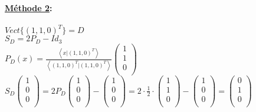 \documentclass{article}
\newcommand{\scalaire}[2]{\left< #1 | #2\right>}
\begin{document}
\paragraph{\underline{Méthode 2}:} $Vect \{(1, 1, 0)^T\} = D$\\
$S_D = 2P_D - Id_3$\\
$P_D(x) = \frac{\scalaire{x}{(1, 1, 0)^T}}{\scalaire{(1, 1, 0)^T}{(1, 1, 0)^T}} \begin{pmatrix}
    1\\
    1\\
    0\\
\end{pmatrix}$\\
$S_D\begin{pmatrix}
    1\\
    0\\
    0\\
\end{pmatrix} = 2P_D\begin{pmatrix}
    1\\
    0\\
    0\\
\end{pmatrix} - \begin{pmatrix}
    1\\
    0\\
    0\\
\end{pmatrix} = 2 \cdot \frac{1}{2} \cdot \begin{pmatrix}
    1\\
    1\\
    0\\
\end{pmatrix} - \begin{pmatrix}
    1\\
    0\\
    0\\
\end{pmatrix} = \begin{pmatrix}
    0\\
    1\\
    0\\
\end{pmatrix}$\\
\end{document}
